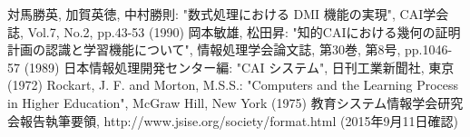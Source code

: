 \documentclass[a4j]{article}
\begin{document}
\begin{thebibliography}{5}
  対馬勝英, 加賀英徳, 中村勝則: "数式処理における DMI 機能の実現", CAI学会誌, Vol.7, No.2, pp.43-53 (1990)
  岡本敏雄, 松田昇: "知的CAIにおける幾何の証明計画の認識と学習機能について", 情報処理学会論文誌, 第30巻, 第8号, pp.1046-57 (1989)
  日本情報処理開発センター編: "CAI システム", 日刊工業新聞社, 東京 (1972)
  Rockart, J. F. and Morton, M.S.S.: "Computers and the Learning Process in Higher Education", McGraw Hill, New York (1975)
  教育システム情報学会研究会報告執筆要領,
  http://www.jsise.org/society/format.html (2015年9月11日確認)
\end{thebibliography}
\end{document}
